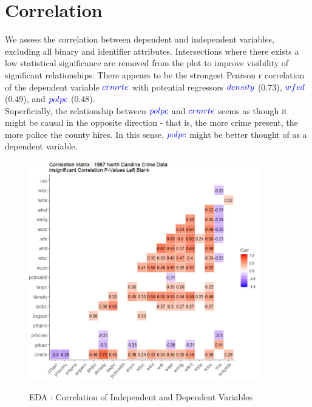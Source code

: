 \pagebreak

\section{Correlation}

We assess the correlation between dependent and independent variables, excluding all binary and identifier attributes.  Intersections where there exists a low statistical significance are removed from the plot to improve visibility of significant relationships.  There appears to be the strongest Pearson r correlation of the dependent variable $\textcolor{Blue}{crmrte}$ with potential regressors $\textcolor{Blue}{density}$ (0.73), $\textcolor{Blue}{wfed}$ (0.49), and $\textcolor{Blue}{polpc}$ (0.48).\\

Superficially, the relationship between $\textcolor{Blue}{polpc}$ and $\textcolor{Blue}{crmrte}$ seems as though it might be causal in the opposite direction - that is, the more crime present, the more police the county hires.  In this sense, $\textcolor{Blue}{polpc}$ might be better thought of as a dependent variable.\\

\begin{figure}[!ht]
	\centering
	\includegraphics[width=0.9\textwidth]{images/EDA_correlation.jpg}
	\label{fig:EDA Correlation Matrix1}
	\caption{EDA : Correlation of Independent and Dependent Variables}
\end{figure}

